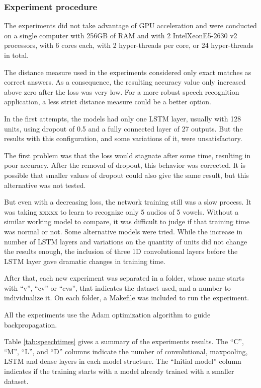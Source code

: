 \subsubsection{Experiment procedure}

The experiments did not take advantage of GPU acceleration and were  conducted on a single computer with 256GB of RAM and with 2 Intel\textregistered Xeon\textregistered E5-2630 v2 processors, with 6 cores each, with 2 hyper-threads per core, or 24 hyper-threads in total. 

The distance measure used in the experiments considered only exact matches as correct answers. As a consequence, the resulting accuracy value only increased above zero after the loss was very low. For a more robust speech recognition application, a less strict distance measure could be a better option.

In the first attempts, the models had only one LSTM layer, usually with 128 units, using dropout of 0.5 and a fully connected layer of 27 outputs. But the results with this configuration, and some variations of it, were unsatisfactory.

The first problem was that the loss would stagnate after some time, resulting in poor accuracy. After the removal of dropout, this behavior was corrected. It is possible that smaller values of dropout could also give the same result, but this alternative was not tested.

But even with a decreasing loss, the network training still was a slow process. It was taking xxxxx 
to learn to recognize only 5 audios of 5 vowels.
Without a similar working model to compare, it was difficult to judge if that training time was normal or not. Some alternative models were tried. While the increase in number of LSTM layers and variations on the quantity of units did not change the results enough, the inclusion of three 1D convolutional layers before the LSTM layer gave dramatic changes in training time.

After that, each new experiment was separated in a folder, whose name starts with ``v'', ``cv'' or ``cvs'', that indicates the dataset used, and a number to individualize it. On each folder, a Makefile was included to run the experiment.

All the experiments use the Adam
optimization algorithm to guide backpropagation.

Table \ref{tab:speechtimes} gives a summary of the experiments results. The ``C'', ``M'', ``L'', and ``D'' columns indicate the number of convolutional, maxpooling, LSTM and dense layers in each model structure. The ``Initial model'' column indicates if the training starts with a model already trained with a smaller dataset. 

